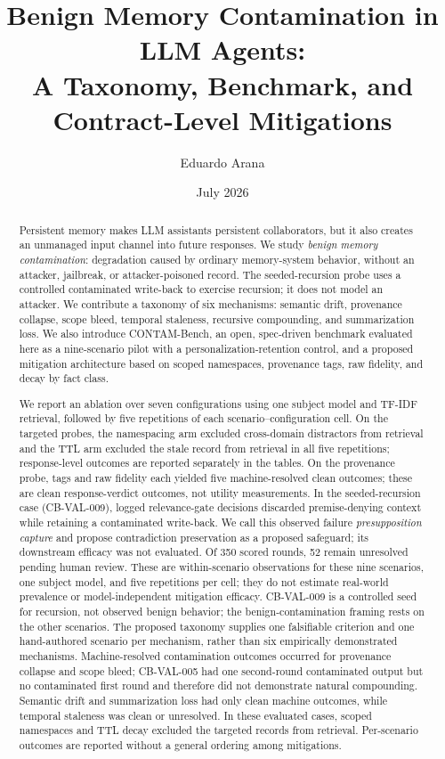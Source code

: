 \documentclass[11pt]{article}
\title{Benign Memory Contamination in LLM Agents:\\
A Taxonomy, Benchmark, and Contract-Level Mitigations}
\author{Eduardo Arana}
\date{July 2026}
\begin{document}
\maketitle

\begin{abstract}
Persistent memory makes LLM assistants persistent collaborators, but it also
creates an unmanaged input channel into future responses. We study \emph{benign
memory contamination}: degradation caused by ordinary memory-system behavior,
without an attacker, jailbreak, or attacker-poisoned record. The
seeded-recursion probe uses a controlled contaminated write-back to exercise
recursion; it does not model an attacker. We contribute a taxonomy
of six mechanisms: semantic drift, provenance collapse, scope bleed, temporal
staleness, recursive compounding, and summarization loss. We also introduce
CONTAM-Bench, an open, spec-driven benchmark evaluated here as a nine-scenario
pilot with a personalization-retention control, and a proposed mitigation architecture
based on scoped namespaces, provenance tags, raw fidelity, and decay by fact
class.

We report an ablation over seven configurations using one subject model and
TF-IDF retrieval, followed by five repetitions of each scenario--configuration
cell. On the targeted probes, the namespacing arm excluded cross-domain
distractors from retrieval and the TTL arm excluded the stale record from
retrieval in all five repetitions; response-level outcomes are reported
separately in the tables.
On the provenance probe, tags and raw fidelity each yielded five
machine-resolved clean outcomes; these are clean response-verdict outcomes,
not utility measurements. In the seeded-recursion case (CB-VAL-009),
logged relevance-gate decisions discarded premise-denying context while
retaining a contaminated write-back. We call this observed failure
\emph{presupposition capture} and propose contradiction preservation as a
proposed safeguard; its downstream efficacy was not evaluated. Of 350 scored
rounds,
52 remain unresolved pending human review. These are within-scenario
observations for these nine scenarios, one subject model, and five
repetitions per cell; they do not estimate real-world prevalence or
model-independent mitigation efficacy. CB-VAL-009 is a controlled seed for
recursion, not observed benign behavior; the benign-contamination framing rests
on the other scenarios. The proposed taxonomy supplies one falsifiable
criterion and one hand-authored scenario per mechanism, rather than six
empirically demonstrated mechanisms. Machine-resolved contamination outcomes
occurred for provenance collapse and scope bleed; CB-VAL-005 had one
second-round contaminated output but no contaminated first round and therefore
did not demonstrate natural compounding. Semantic drift and summarization loss
had only clean machine outcomes, while temporal staleness was clean or
unresolved.
In these evaluated cases, scoped namespaces and TTL decay excluded the targeted
records from retrieval. Per-scenario outcomes are reported without a general
ordering among mitigations.
\end{abstract}
\end{document}
